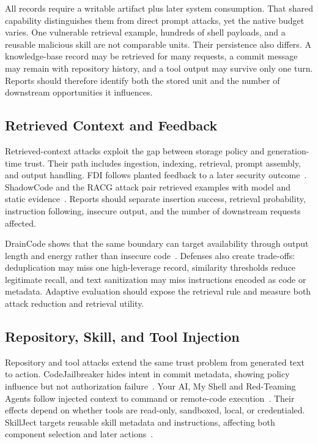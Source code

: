 \documentclass[acmsmall,screen,review]{acmart}
\begin{document}
All records require a writable artifact plus later system consumption. That shared capability distinguishes them from direct prompt attacks, yet the native budget varies. One vulnerable retrieval example, hundreds of shell payloads, and a reusable malicious skill are not comparable units. Their persistence also differs. A knowledge-base record may be retrieved for many requests, a commit message may remain with repository history, and a tool output may survive only one turn. Reports should therefore identify both the stored unit and the number of downstream opportunities it influences.

\subsection{Retrieved Context and Feedback}
Retrieved-context attacks exploit the gap between storage policy and generation-time trust. Their path includes ingestion, indexing, retrieval, prompt assembly, and output handling. FDI follows planted feedback to a later security outcome~\cite{wu2024fdi}. ShadowCode and the RACG attack pair retrieved examples with model and static evidence~\cite{shadowcode2024,lin2025racg}. Reports should separate insertion success, retrieval probability, instruction following, insecure output, and the number of downstream requests affected.

DrainCode shows that the same boundary can target availability through output length and energy rather than insecure code~\cite{wang2025draincode}. Defenses also create trade-offs: deduplication may miss one high-leverage record, similarity thresholds reduce legitimate recall, and text sanitization may miss instructions encoded as code or metadata. Adaptive evaluation should expose the retrieval rule and measure both attack reduction and retrieval utility.

\subsection{Repository, Skill, and Tool Injection}
Repository and tool attacks extend the same trust problem from generated text to action. CodeJailbreaker hides intent in commit metadata, showing policy influence but not authorization failure~\cite{codejailbreaker2025}. Your AI, My Shell and Red-Teaming Agents follow injected context to command or remote-code execution~\cite{liu2025yourai,xie2025redteaming}. Their effects depend on whether tools are read-only, sandboxed, local, or credentialed. SkillJect targets reusable skill metadata and instructions, affecting both component selection and later actions~\cite{skillject2026}.
\end{document}
